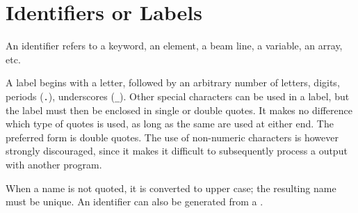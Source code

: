 \section{Identifiers or Labels}
\label{sec:label}
An identifier refers to a keyword, an element, a beam line, a variable,
an array, etc. 

A label begins with a letter, followed by an arbitrary number of letters,
digits, periods (\texttt{.}), underscores (\texttt{\_}).
Other special characters can be used in a label,
but the label must then be enclosed in single or double quotes.
It makes no difference which type of quotes is used,
as long as the same are used at either end.
The preferred form is double quotes.
The use of non-numeric characters is however strongly discouraged,
since it makes it difficult to subsequently process a \opal output with
another program.

When a name is not quoted, it is converted to upper case;
the resulting name must be unique.
An identifier can also be generated from a
. 

